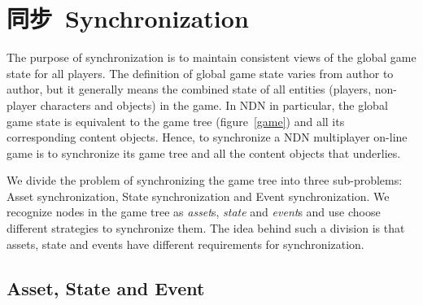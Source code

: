 \chapter{同步~Synchronization}

\label{sync}

The purpose of synchronization is to maintain consistent views of the global game state for all players. The definition of global game state varies from author to author, but it generally means the combined state of all entities (players, non-player characters and objects) in the game. In NDN in particular, the global game state is equivalent to the game tree (figure~\ref{game}) and all its corresponding content objects. Hence, to synchronize a NDN multiplayer on-line game is to synchronize its game tree and all the content objects that underlies.

We divide the problem of synchronizing the game tree into three sub-problems: Asset synchronization, State synchronization and Event synchronization. We recognize nodes in the game tree as \emph{asset}s, \emph{state} and \emph{event}s and use choose different strategies to synchronize them. The idea behind such a division is that assets, state and events have different requirements for synchronization.

\section{Asset, State and Event}
\label{ase}

